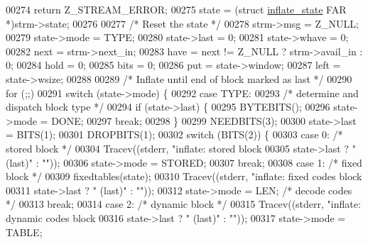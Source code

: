 \begin{DoxyCode}
00274         \textcolor{keywordflow}{return} Z\_STREAM\_ERROR;
00275     state = (\textcolor{keyword}{struct }\hyperlink{structinflate__state}{inflate\_state} FAR *)strm->state;
00276 
00277     \textcolor{comment}{/* Reset the state */}
00278     strm->msg = Z\_NULL;
00279     state->mode = TYPE;
00280     state->last = 0;
00281     state->whave = 0;
00282     next = strm->next\_in;
00283     have = next != Z\_NULL ? strm->avail\_in : 0;
00284     hold = 0;
00285     bits = 0;
00286     put = state->window;
00287     left = state->wsize;
00288 
00289     \textcolor{comment}{/* Inflate until end of block marked as last */}
00290     for (;;)
00291         \textcolor{keywordflow}{switch} (state->mode) \{
00292         \textcolor{keywordflow}{case} TYPE:
00293             \textcolor{comment}{/* determine and dispatch block type */}
00294             \textcolor{keywordflow}{if} (state->last) \{
00295                 BYTEBITS();
00296                 state->mode = DONE;
00297                 \textcolor{keywordflow}{break};
00298             \}
00299             NEEDBITS(3);
00300             state->last = BITS(1);
00301             DROPBITS(1);
00302             \textcolor{keywordflow}{switch} (BITS(2)) \{
00303             \textcolor{keywordflow}{case} 0:                             \textcolor{comment}{/* stored block */}
00304                 Tracev((stderr, \textcolor{stringliteral}{"inflate:     stored block%
00305                         state->last ? \textcolor{stringliteral}{" (last)"} : \textcolor{stringliteral}{""}));
00306                 state->mode = STORED;
00307                 \textcolor{keywordflow}{break};
00308             \textcolor{keywordflow}{case} 1:                             \textcolor{comment}{/* fixed block */}
00309                 fixedtables(state);
00310                 Tracev((stderr, \textcolor{stringliteral}{"inflate:     fixed codes block%
00311                         state->last ? \textcolor{stringliteral}{" (last)"} : \textcolor{stringliteral}{""}));
00312                 state->mode = LEN;              \textcolor{comment}{/* decode codes */}
00313                 \textcolor{keywordflow}{break};
00314             \textcolor{keywordflow}{case} 2:                             \textcolor{comment}{/* dynamic block */}
00315                 Tracev((stderr, \textcolor{stringliteral}{"inflate:     dynamic codes block%
00316                         state->last ? \textcolor{stringliteral}{" (last)"} : \textcolor{stringliteral}{""}));
00317                 state->mode = TABLE;
}}}
\end{DoxyCode}
